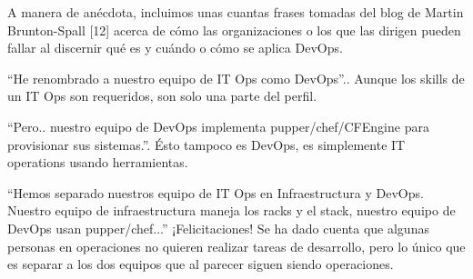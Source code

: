 \documentclass[conference]{IEEEtran}
\begin{document}
A manera de anécdota, incluimos unas cuantas frases tomadas del blog de Martin Brunton-Spall [12] acerca de cómo las organizaciones o los que las dirigen pueden fallar al discernir qué es y cuándo o cómo se aplica DevOps.

“He renombrado a nuestro equipo de IT Ops como DevOps”.. Aunque los skills de un IT Ops son requeridos, son solo una parte del perfil.

“Pero.. nuestro equipo de DevOps implementa pupper/chef/CFEngine para provisionar sus sistemas.”. Ésto tampoco es DevOps, es simplemente IT operations usando herramientas.

“Hemos separado nuestros equipo de IT Ops en Infraestructura y DevOps. Nuestro equipo de infraestructura maneja los racks y el stack, nuestro equipo de DevOps usan pupper/chef...” ¡Felicitaciones! Se ha dado cuenta que algunas personas en operaciones no quieren realizar tareas de desarrollo, pero lo único que es separar a los dos equipos que al parecer siguen siendo operaciones.

%
%

\end{document}
